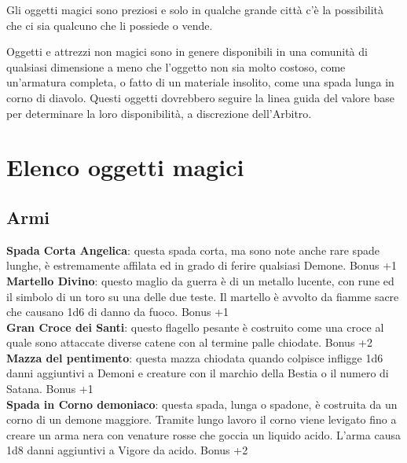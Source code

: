 \documentclass[12pt,a4paper,twoside,openany]{book}
\begin{document}
\begin{multicols}{2}

\bigskip

Gli oggetti magici sono preziosi e solo in qualche grande città c'è la possibilità che ci sia qualcuno che li possiede o vende.

Oggetti e attrezzi non magici sono in genere disponibili in una comunità di qualsiasi dimensione a meno che l'oggetto non sia molto costoso, come un'armatura completa, o fatto di un materiale insolito, come una spada lunga in corno di diavolo. Questi oggetti dovrebbero seguire la linea guida del valore base per determinare la loro disponibilità, a discrezione dell'Arbitro.

\pagebreak

\section{Elenco oggetti magici}

\subsection{Armi}

\textbf{Spada Corta Angelica}: questa spada corta, ma sono note anche rare spade lunghe, è estremamente affilata ed in grado di ferire qualsiasi Demone. Bonus +1\\

\textbf{Martello Divino}: questo maglio da guerra è di un metallo lucente, con rune ed il simbolo di un toro su una delle due teste. Il martello è avvolto da fiamme sacre che causano 1d6 di danno da fuoco. Bonus +1\\

\textbf{Gran Croce dei Santi}: questo flagello pesante è costruito come una croce al quale sono attaccate diverse catene con al termine palle chiodate. Bonus +2\\ 

\textbf{Mazza del pentimento}: questa mazza chiodata quando colpisce infligge 1d6 danni aggiuntivi a Demoni e creature con il marchio della Bestia o il numero di Satana. Bonus +1\\

\textbf{Spada in Corno demoniaco}: questa spada, lunga o spadone, è costruita da un corno di un demone maggiore. Tramite lungo lavoro il corno viene levigato fino a creare un arma nera con venature rosse che goccia un liquido acido. L'arma causa 1d8 danni aggiuntivi a Vigore da acido. Bonus +2\\


\end{multicols}
\end{document}
